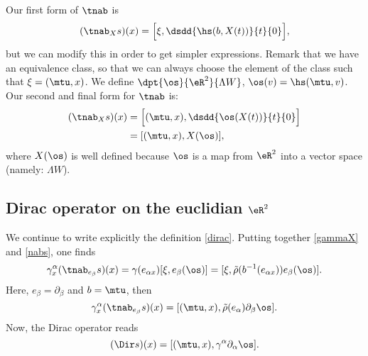 Our first form of $\tnab$ is
\[
(\tnab_Xs)(x)=\Big[\xi,\dsdd{\hs(b,X(t))}{t}{0}\Big],
\]
but we can modify this in order to get simpler expressions. Remark that we have an equivalence class, so that we can always choose the element of the class such that $\xi=(\mtu,x)$. We define $\dpt{\os}{\eR^2}{\Lambda W }$, $\os(v)=\hs(\mtu,v)$. Our second and final form for $\tnab$ is:
\begin{subequations}
 \begin{align}
 (\tnab_Xs)(x)&=\Big[(\mtu,x),\dsdd{\os(X(t))}{t}{0}\Big]\\\label{nabs}
              &=[(\mtu,x),X(\os)],
\end{align}
\end{subequations}
where $X(\os)$ is well defined because $\os$ is a map from $\eR^2$ into a vector space (namely: $\Lambda W $).

\subsection{Dirac operator on the euclidian \texorpdfstring{$\eR^2$}{R2}}

We continue to write explicitly the definition \eqref{dirac}. Putting together \eqref{gammaX} and \eqref{nabs}, one finds
\begin{equation}
 \gamma^{\alpha}_x(\tnab_{e_{\beta}}s)(x)	=\gamma(e_{\alpha x})[\xi,e_{\beta}(\os)]
                                     		=[\xi,\tilde\rho(b^{-1}(e_{\alpha x}))e_{\beta}(\os)].
\end{equation}
Here, $e_{\beta}=\partial_{\beta}$ and $b=\mtu$, then
\[
 \gamma^{\alpha}_x(\tnab_{e_{\beta}}s)(x)=[(\mtu,x),\tilde\rho(e_{\alpha})\partial_{\beta}\os].
\]
Now, the Dirac operator reads
\[
 (\Dir s)(x)=[(\mtu,x),\gamma^{\alpha}\partial_{\alpha}\os].
\]

